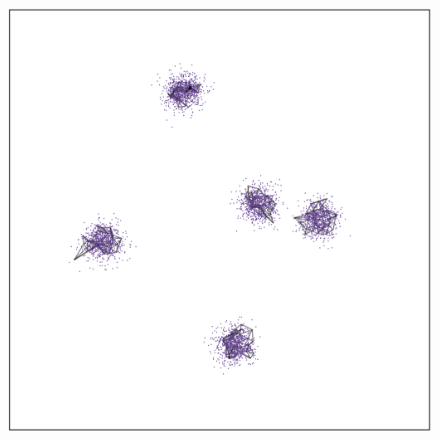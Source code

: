 \documentclass[
  12pt]{article}
\begin{document}
\begin{figure}[H]
\begin{minipage}[t]{0.33\linewidth}
{{\includegraphics{figures/five_gau_clusters/sc_pacmap_2.png}

}

}

\subcaption{\label{fig-gau5_sc2}}
\end{minipage}%
%
\begin{minipage}[t]{0.33\linewidth}

{\centering 

}
\end{minipage}
\end{figure}
\end{document}
